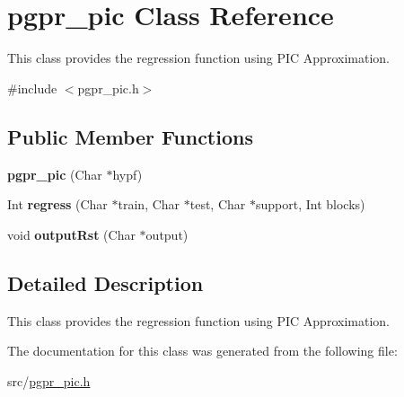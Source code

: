 \hypertarget{classpgpr__pic}{\section{pgpr\+\_\+pic Class Reference}
\label{classpgpr__pic}
}


This class provides the regression function using P\+I\+C Approximation.  




{\ttfamily \#include $<$pgpr\+\_\+pic.\+h$>$}

\subsection*{Public Member Functions}
\begin{DoxyCompactItemize}
\item 
\hypertarget{classpgpr__pic_ac79ec6dda8f0ecb0034ab3854243def6}{{\bfseries pgpr\+\_\+pic} (Char $\ast$hypf)}\label{classpgpr__pic_ac79ec6dda8f0ecb0034ab3854243def6}

\item 
\hypertarget{classpgpr__pic_a698e7cca6b9b7681972097bf7b6d8a6d}{Int {\bfseries regress} (Char $\ast$train, Char $\ast$test, Char $\ast$support, Int blocks)}\label{classpgpr__pic_a698e7cca6b9b7681972097bf7b6d8a6d}

\item 
\hypertarget{classpgpr__pic_a6908ad24c9b87f86c47242013976bddc}{void {\bfseries output\+Rst} (Char $\ast$output)}\label{classpgpr__pic_a6908ad24c9b87f86c47242013976bddc}

\end{DoxyCompactItemize}


\subsection{Detailed Description}
This class provides the regression function using P\+I\+C Approximation. 

The documentation for this class was generated from the following file\+:\begin{DoxyCompactItemize}
\item 
src/\hyperlink{pgpr__pic_8h}{pgpr\+\_\+pic.\+h}\end{DoxyCompactItemize}
